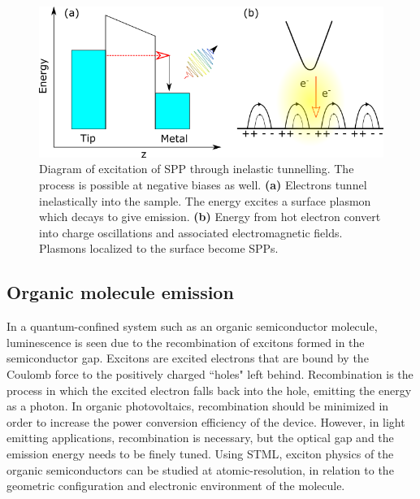 
\begin{figure} [h]
    \centering
    \includegraphics[width=\textwidth]{pictures/spp_emission.png}
    \caption{ Diagram of excitation of SPP through inelastic tunnelling. The process is possible at negative biases as well. \textbf{(a)} Electrons tunnel inelastically into the sample. The energy excites a surface plasmon which decays to give emission. \textbf{(b)} Energy from hot electron convert into charge oscillations and associated electromagnetic fields. Plasmons localized to the surface become SPPs. }
    \label{fig:exptech:iet-het}
\end{figure}

\subsection{Organic molecule emission}

In a quantum-confined system such as an organic semiconductor molecule, luminescence is seen due to the recombination of excitons formed in the semiconductor gap. Excitons are excited electrons that are bound by the Coulomb force to the positively charged ``holes" left behind. Recombination is the process in which the excited electron falls back into the hole, emitting the energy as a photon. In organic photovoltaics, recombination should be minimized in order to increase the power conversion efficiency of the device. However, in light emitting applications, recombination is necessary, but the optical gap and the emission energy needs to be finely tuned. Using \ac{STML}, exciton physics of the organic semiconductors can be studied at atomic-resolution, in relation to the geometric configuration and electronic environment of the molecule.

